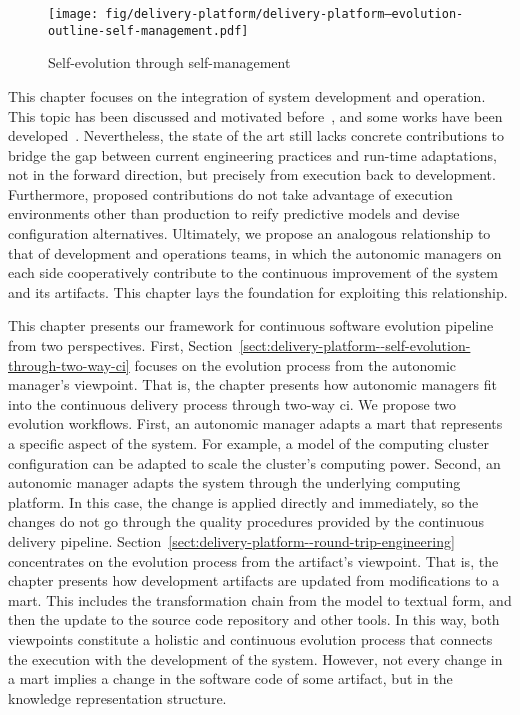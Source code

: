 \begin{figure}[h]
	\centering
	\texttt{[image: fig/delivery-platform/delivery-platform--evolution-outline-self-management.pdf]}
	\caption{Self-evolution through self-management}
	\label{fig:delivery-platform--evolution-outline-self-management}
\end{figure}

This chapter focuses on the integration of system development and operation. This topic has been discussed and motivated before~\cite{gacek-2008-friends,ghezzi-2008-dynamically,baresi-2010-disappearing}, and some works have been developed~\cite{andersson-2013-software,cito-2019-interactive}. Nevertheless, the state of the art still lacks concrete contributions to bridge the gap between current engineering practices and run-time adaptations, not in the forward direction, but precisely from execution back to development. Furthermore, proposed contributions do not take advantage of execution environments other than production to reify predictive models and devise configuration alternatives. Ultimately, we propose an analogous relationship to that of development and operations teams, in which the autonomic managers on each side cooperatively contribute to the continuous improvement of the system and its artifacts. This chapter lays the foundation for exploiting this relationship.

This chapter presents our framework for continuous software evolution pipeline from two perspectives. First, Section~\ref{sect:delivery-platform--self-evolution-through-two-way-ci} focuses on the evolution process from the autonomic manager's viewpoint. That is, the chapter presents how autonomic managers fit into the continuous delivery process through two-way \gls{ci}. We propose two evolution workflows. First, an autonomic manager adapts a \gls{mart} that represents a specific aspect of the system. For example, a model of the computing cluster configuration can be adapted to scale the cluster's computing power. Second, an autonomic manager adapts the system through the underlying computing platform. In this case, the change is applied directly and immediately, so the changes do not go through the quality procedures provided by the continuous delivery pipeline. Section~\ref{sect:delivery-platform--round-trip-engineering} concentrates on the evolution process from the artifact's viewpoint. That is, the chapter presents how development artifacts are updated from modifications to a \gls{mart}. This includes the transformation chain from the model to textual form, and then the update to the source code repository and other tools. In this way, both viewpoints constitute a holistic and continuous evolution process that connects the execution with the development of the system. However, not every change in a \gls{mart} implies a change in the software code of some artifact, but in the knowledge representation structure.


